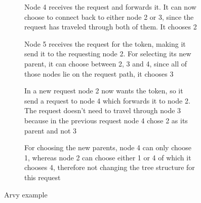 \documentclass[a4paper, oneside]{discothesis}
\begin{document}
\begin{figure}
\ContinuedFloat
\begin{subfigure}[t]{0.5\textwidth}
\centering
{}
\caption{Node 4 receives the request and forwards it. It can now choose to connect back to either node 2 or 3, since the request has traveled through both of them. It chooses 2}
\end{subfigure}
\quad
\begin{subfigure}[t]{0.5\textwidth}
\centering
{}
\caption{Node 5 receives the request for the token, making it send it to the requesting node 2. For selecting its new parent, it can choose between 2, 3 and 4, since all of those nodes lie on the request path, it chooses 3}
\end{subfigure}

\begin{subfigure}[t]{0.5\textwidth}
\centering
{}
\caption{In a new request node 2 now wants the token, so it send a request to node 4 which forwards it to node 2. The request doesn't need to travel through node 3 because in the previous request node 4 chose 2 as its parent and not 3}
\end{subfigure}
\quad
\begin{subfigure}[t]{0.5\textwidth}
\centering
{}
\caption{For choosing the new parents, node 4 can only choose 1, whereas node 2 can choose either 1 or 4 of which it chooses 4, therefore not changing the tree structure for this request}
\end{subfigure}
\caption{Arvy example}
\label{fig:arvy}
\end{figure}
\end{document}
